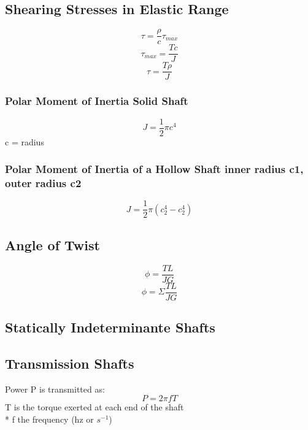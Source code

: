 \documentclass[10pt,landscape]{article}
\begin{document}
\begin{multicols}{3}
\subsection{Shearing Stresses in Elastic Range}
\begin{equation}
    \tau=\frac{\rho}{c}\tau_{max}
\end{equation}
\begin{equation}
    \tau_{max}=\frac{Tc}{J}
\end{equation}
\begin{equation}
    \tau=\frac{T\rho}{J}
\end{equation}
\subsubsection{Polar Moment of Inertia Solid Shaft}
\begin{equation}
    J=\frac{1}{2}\pi c^4
\end{equation}
c = radius
\subsubsection{Polar Moment of Inertia of a Hollow Shaft inner radius c1, outer radius c2}
\begin{equation}
    J=\frac{1}{2}\pi(c_2^4-c_2^4)
\end{equation}
\subsection{Angle of Twist}
\begin{equation}
    \phi=\frac{TL}{JG}
\end{equation}
\begin{equation}
    \phi=\Sigma\frac{TL}{JG}
\end{equation}
\subsection{Statically Indeterminante Shafts}
\subsection{Transmission Shafts}
Power P is transmitted as:
\begin{equation}
    P=2\pi fT
\end{equation}
T is the torque exerted at each end of the shaft\\*
f the frequency (hz or $s^{-1}$)

\end{multicols}
\end{document}
